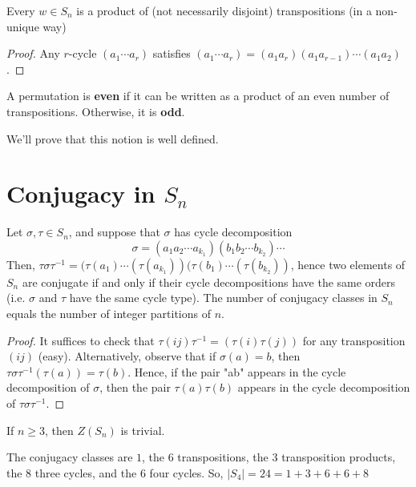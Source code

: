 \begin{prop}
    Every $w \in S_n$ is a product of (not necessarily disjoint) transpositions (in a non-unique way)
\end{prop}

\begin{proof}
    Any $r$-cycle $(a_1\cdots a_r)$ satisfies $(a_1\cdots a_r)=(a_1a_r)(a_1a_{r-1})\cdots (a_1a_2)$.
\end{proof}

\begin{defn}
    A permutation is \textbf{even} if it can be written as a product of an even number of transpositions. Otherwise, it is \textbf{odd}.
\end{defn}
We'll prove that this notion is well defined.

\section{\texorpdfstring{Conjugacy in $S_n$}{Conjugacy in Sn}}

\begin{prop}
    Let $\sigma,\tau \in S_n$, and suppose that $\sigma$ has cycle decomposition
    $$\sigma = (a_1a_2\cdots a_{k_1})(b_1b_2\cdots b_{k_2})\cdots$$
    Then, $\tau \sigma \tau ^{-1}=(\tau (a_1)\cdots (\tau(a_{k_1}))(\tau (b_1) \cdots (\tau (b_{k_2}))$, hence two elements of $S_n$ are conjugate if and only if their cycle decompositions have the same orders (i.e. $\sigma$ and $\tau$ have the same cycle type). The number of conjugacy classes in $S_n$ equals the number of integer partitions of $n$.
\end{prop}

\begin{proof}
    It suffices to check that $\tau (ij)\tau ^{-1}=(\tau (i)\tau (j))$ for any transposition $(ij)$ (easy). Alternatively, observe that if $\sigma (a)=b$, then $\tau\sigma \tau ^{-1}(\tau (a))=\tau (b)$. Hence, if the pair "ab" appears in the cycle decomposition of $\sigma$, then the pair $\tau(a)\tau (b)$ appears in the cycle decomposition of $\tau \sigma \tau ^{-1}$.
\end{proof}

\begin{cor}
    If $n \geq 3$, then $Z(S_n)$ is trivial.
\end{cor}

\begin{ex}
    The conjugacy classes are $1$, the $6$ transpositions, the $3$ transposition products, the $8$ three cycles, and the $6$ four cycles. So, $|S_4| =24=1+3+6+6+8$
\end{ex}

